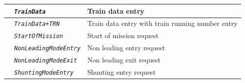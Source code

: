 \documentclass{template/openetcs}
\begin{document}
\begin{itemize}
\begin{longtable}{|l|l|l|}
			\hline
			
			&	\begin{minipage}[t]{0.40\linewidth} \emph{\texttt{TrainData}} \end{minipage}
			&	\begin{minipage}[t]{0.38\linewidth} Train data entry \end{minipage} \\
			
			\hline
			
			&	\begin{minipage}[t]{0.40\linewidth} \emph{\texttt{TrainData+TRN}} \end{minipage}
			&	\begin{minipage}[t]{0.38\linewidth} Train data entry with train running number entry \end{minipage} \\
			
			\hline
			
			&	\begin{minipage}[t]{0.40\linewidth} \emph{\texttt{StartOfMission}} \end{minipage}
			&	\begin{minipage}[t]{0.38\linewidth} Start of mission request \end{minipage} \\
			
			\hline
			
			&	\begin{minipage}[t]{0.40\linewidth} \emph{\texttt{NonLeadingModeEntry}} \end{minipage}
			&	\begin{minipage}[t]{0.38\linewidth} Non leading entry request \end{minipage} \\
			
			\hline
			
			&	\begin{minipage}[t]{0.40\linewidth} \emph{\texttt{NonLeadingModeExit}} \end{minipage}
			&	\begin{minipage}[t]{0.38\linewidth} Non leading exit request \end{minipage} \\
			
			\hline
			
			&	\begin{minipage}[t]{0.40\linewidth} \emph{\texttt{ShuntingModeEntry}} \end{minipage}
			&	\begin{minipage}[t]{0.38\linewidth} Shunting entry request \end{minipage} \\
			

\end{longtable}
\end{itemize}
\end{document}
